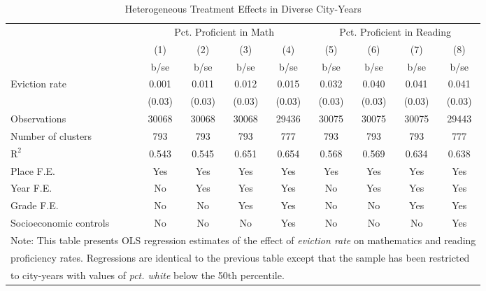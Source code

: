 \begin{table}[htbp]\centering
\def\sym#1{\ifmmode^{#1}\else\(^{#1}\)\fi}
\caption{Heterogeneous Treatment Effects in Diverse City-Years}
\begin{tabular}{l*{8}{c}}
\toprule
                    &\multicolumn{4}{c}{Pct. Proficient in Math}        &\multicolumn{4}{c}{Pct. Proficient in Reading}     \\\cmidrule(lr){2-5}\cmidrule(lr){6-9}
                    &\multicolumn{1}{c}{(1)}&\multicolumn{1}{c}{(2)}&\multicolumn{1}{c}{(3)}&\multicolumn{1}{c}{(4)}&\multicolumn{1}{c}{(5)}&\multicolumn{1}{c}{(6)}&\multicolumn{1}{c}{(7)}&\multicolumn{1}{c}{(8)}\\
                    &        b/se&        b/se&        b/se&        b/se&        b/se&        b/se&        b/se&        b/se\\
\midrule
Eviction rate       &       0.001&       0.011&       0.012&       0.015&       0.032&       0.040&       0.041&       0.041\\
                    &      (0.03)&      (0.03)&      (0.03)&      (0.03)&      (0.03)&      (0.03)&      (0.03)&      (0.03)\\
\midrule
Observations        &       30068&       30068&       30068&       29436&       30075&       30075&       30075&       29443\\
Number of clusters  &         793&         793&         793&         777&         793&         793&         793&         777\\
$\text{R}^2$        &       0.543&       0.545&       0.651&       0.654&       0.568&       0.569&       0.634&       0.638\\
Place F.E.          &         Yes&         Yes&         Yes&         Yes&         Yes&         Yes&         Yes&         Yes\\
Year F.E.           &          No&         Yes&         Yes&         Yes&          No&         Yes&         Yes&         Yes\\
Grade F.E.          &          No&          No&         Yes&         Yes&          No&          No&         Yes&         Yes\\
Socioeconomic controls&          No&          No&          No&         Yes&          No&          No&          No&         Yes\\
\bottomrule
\multicolumn{9}{l}{\footnotesize Note: This table presents OLS regression estimates of the effect of \emph{eviction rate} on mathematics and reading}\\
\multicolumn{9}{l}{\footnotesize proficiency rates. Regressions are identical to the previous table except that the sample has been restricted}\\
\multicolumn{9}{l}{\footnotesize to city-years with values of \emph{pct. white} below the 50th percentile.}\\
\end{tabular}
\end{table}
